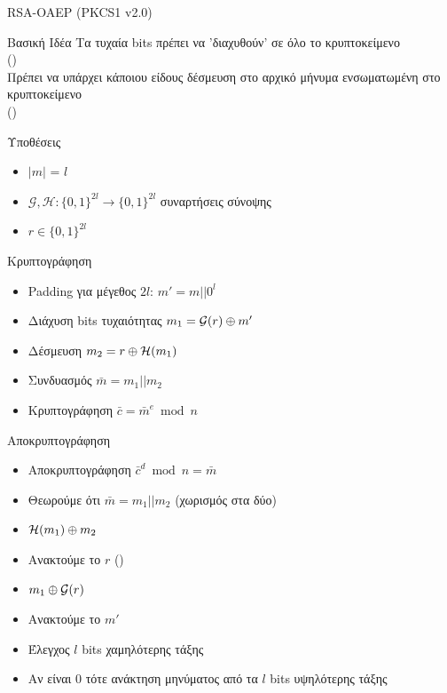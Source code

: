 \documentclass[handout]{beamer}
\begin{document}
\begin{frame}[allowframebreaks]{RSA-OAEP (PKCS1 v2.0)}
\begin{block}{Βασική Ιδέα}
Τα τυχαία bits πρέπει να 'διαχυθούν' σε όλο το κρυπτοκείμενο \\
() \\
Πρέπει να υπάρχει κάποιου είδους δέσμευση στο αρχικό μήνυμα ενσωματωμένη στο κρυπτοκείμενο \\
()
\end{block}

\begin{block}{Υποθέσεις}
\begin{itemize}
\item $|m|$ = $l$
\item $\mathcal{G}, \mathcal{H} : \{0,1\}^{2l} \rightarrow \{0,1\}^{2l}$ συναρτήσεις σύνοψης
\item $r \in \{0,1\}^{2l}$
\end{itemize}
\end{block}


\framebreak 
 
\begin{block}{Κρυπτογράφηση}
\begin{itemize}
\item Padding για μέγεθος $2l$: $m' = m || 0^l$
\item Διάχυση bits τυχαιότητας $m_1 = \mathcal{G}(r) \oplus m'$
\item Δέσμευση $m_2 = r \oplus \mathcal{H}(m_1)$
\item Συνδυασμός $\bar{m} = m_1 || m_2$
\item Κρυπτογράφηση $\bar{c} = \bar{m}^e \bmod n$
\end{itemize}
\end{block}

\framebreak 

\begin{block}{Αποκρυπτογράφηση}
\begin{itemize}
\item Αποκρυπτογράφηση $\bar{c}^d \bmod n = \bar m$
\item Θεωρούμε ότι $\bar{m} = m_1 || m_2$ (χωρισμός στα δύο)
\item $\mathcal{H}(m_1) \oplus m_2$
\item Ανακτούμε το $r$ ()
\item $m_1 \oplus \mathcal{G}(r)$
\item Ανακτούμε το $m'$
\item Έλεγχος $l$ bits χαμηλότερης τάξης
\item Αν είναι 0 τότε ανάκτηση μηνύματος από τα $l$ bits υψηλότερης τάξης
\end{itemize}
\end{block}


\end{frame}
\end{document}
